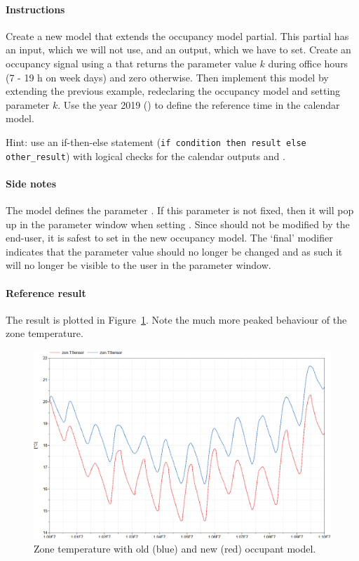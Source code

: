 \documentclass[10pt,a4paper]{article}
\begin{document}
\paragraph{Instructions}
Create a new model that extends the occupancy model partial.
This partial has an input, which we will not use, and an output, which we have to set.
Create an occupancy signal using a  that
returns the parameter value $k$ during office hours 
(7 - 19 h on week days) and zero otherwise.
Then implement this model by extending the previous example, 
redeclaring the occupancy model and setting parameter $k$.
Use the year 2019 () to define the reference time in the calendar model.

Hint: use an if-then-else statement (\texttt{if condition then result else other\_result}) with logical checks for the calendar outputs  and .

\paragraph{Side notes}
The model  
defines the parameter .
If this parameter is not fixed, then it will pop up in the parameter window when
setting . Since  should not be modified by the end-user,
it is safest to set  in the new occupancy model.
The `final' modifier indicates that the parameter value should no longer be changed
and as such it will no longer be visible to the user in the parameter window.

\paragraph{Reference result}
The result 
is plotted in Figure~\ref{fig:res4}.
Note the much more peaked behaviour of the zone temperature.

\begin{figure}[h!]
\centering
\includegraphics[scale=0.65]{Example4.png}
\caption{Zone temperature with old (blue) and new (red) occupant model.}
\label{fig:res4}
\end{figure}
\end{document}
